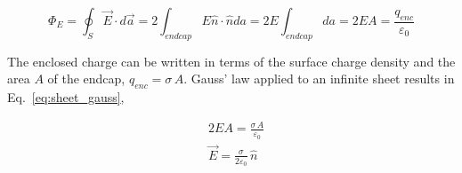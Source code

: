 \documentclass[12pt]{article}
\begin{document}
\begin{flushleft}
\begin{equation*}
\Phi_{E}=\oint_{S} \vec{E} \cdot d\vec{a} = 2 \int_{endcap} E\hat{n} \cdot \hat{n} da  = 2E \int_{endcap} da = 2EA = \frac{q_{enc}}{\varepsilon_{0}} 
\end{equation*}

The enclosed charge can be written in terms of the surface charge density and the area $A$ of the endcap, $q_{enc}=\sigma \, A$.  Gauss' law applied to an infinite sheet results in  Eq.~\ref{eq:sheet_gauss},

\begin{equation*}
\begin{aligned}
&  2EA = \frac{ \sigma \, A}{\varepsilon_{0}} \\
&  \vec{E} = \frac{ \sigma }{2\varepsilon_{0}} \, \hat{n}
\end{aligned}
\end{equation*}


\end{flushleft}
\end{document}

